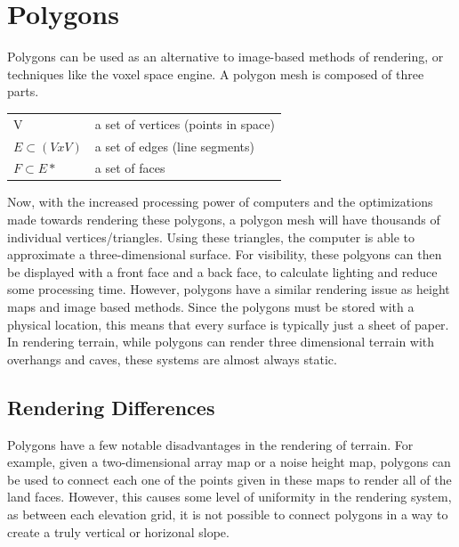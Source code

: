 \documentclass[10pt]{report}
\begin{document}
	\vspace{10pt}
	\let\clearpage\relax	
	\chapter{Polygons}
	
		Polygons can be used as an alternative to image-based methods of rendering, or techniques like the voxel space engine. A polygon mesh is composed of three parts.
		
		\begin{center}
			\begin{tabular}{ l l } 
				V & a set of vertices (points in space)\\ 
				$E {\subset} (V x V)$ & a set of edges (line segments)\\ 
				$F {\subset} E*$  & a set of faces \\
			\end{tabular}
		\end{center}
	
		Now, with the increased processing power of computers and the optimizations made towards rendering these polygons, a polygon mesh will have thousands of individual vertices/triangles. Using these triangles, the computer is able to approximate a three-dimensional surface. For visibility, these polgyons can then be displayed with a front face and a back face, to calculate lighting and reduce some processing time. However, polygons have a similar rendering issue as height maps and image based methods. Since the polygons must be stored with a physical location, this means that every surface is typically just a sheet of paper. In rendering terrain, while polygons can render three dimensional terrain with overhangs and caves, these systems are almost always static. 
	
		\section{Rendering Differences}
		Polygons have a few notable disadvantages in the rendering of terrain. For example, given a two-dimensional array map or a noise height map, polygons can be used to connect each one of the points given in these maps to render all of the land faces. However, this causes some level of uniformity in the rendering system, as between each elevation grid, it is not possible to connect polygons in a way to create a truly vertical or horizonal slope. 
		
\end{document}
